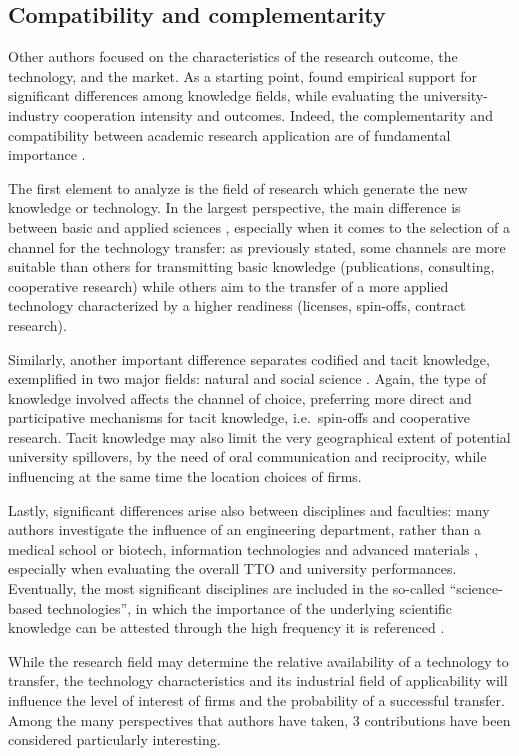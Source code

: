 \subsection{Compatibility and complementarity}

Other authors focused on the characteristics of the research outcome, the technology, and the market. As a starting point, \citet{Tijssen2006} found empirical support for significant differences among knowledge fields, while evaluating the university-industry cooperation intensity and outcomes. Indeed, the complementarity and compatibility between academic research application are of fundamental importance \citep{Geuna2009}.

The first element to analyze is the field of research which generate the new knowledge or technology. In the largest perspective, the main difference is between basic and applied sciences \citep{DEste2007}, especially when it comes to the selection of a channel for the technology transfer: as previously stated, some channels are more suitable than others for transmitting basic knowledge (publications, consulting, cooperative research) while others aim to the transfer of a more applied technology characterized by a higher readiness (licenses, spin-offs, contract research).

Similarly, another important difference separates codified and tacit knowledge, exemplified in two major fields: natural and social science \citep{Audretsch2004}. Again, the type of knowledge involved affects the channel of choice, preferring more direct and participative mechanisms for tacit knowledge, i.e.\ spin-offs and cooperative research. Tacit knowledge may also limit the very geographical extent of potential university spillovers, by the need of oral communication and reciprocity, while influencing at the same time the location choices of firms.

Lastly, significant differences arise also between disciplines and faculties: many authors investigate the influence of an engineering department, rather than a medical school or biotech, information technologies and advanced materials \citep{DEste2007}, especially when evaluating the overall TTO and university performances. Eventually, the most significant disciplines are included in the so-called \enquote{science-based technologies}, in which the importance of the underlying scientific knowledge can be attested through the high frequency it is referenced \citep{Debackere2005}.

While the research field may determine the relative availability of a technology to transfer, the technology characteristics and its industrial field of applicability will influence the level of interest of firms and the probability of a successful transfer. Among the many perspectives that authors have taken, 3 contributions have been considered particularly interesting.


